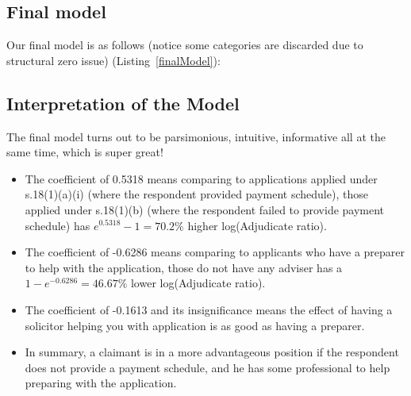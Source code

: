 \documentclass[12pt, b4paper]{article}
\begin{document}
  \subsection{Final model}
  Our final model is as follows (notice some categories are discarded due to structural zero issue) (Listing~\ref{finalModel}): 
  

  \subsection{Interpretation of the Model} 
  The final model turns out to be parsimonious, intuitive, informative all at the same time, which is super great! 
  \begin{itemize}
    \item The coefficient of 0.5318 means comparing to applications applied under s.18(1)(a)(i) (where the respondent provided payment schedule), those applied under s.18(1)(b) (where the respondent failed to provide payment schedule) has $e^{0.5318} - 1 = 70.2\% $ higher log(Adjudicate ratio). 
    \item The coefficient of -0.6286 means comparing to applicants who have a preparer to help with the application, those do not have any adviser has a $1 - e^{-0.6286} = 46.67\%$ lower log(Adjudicate ratio).
    \item The coefficient of -0.1613 and its insignificance means the effect of having a solicitor helping you with application is as good as having a preparer.
    \item In summary, a claimant is in a more advantageous position if the respondent does not provide a payment schedule, and he has some professional to help preparing with the application.
  \end{itemize}
\end{document}
